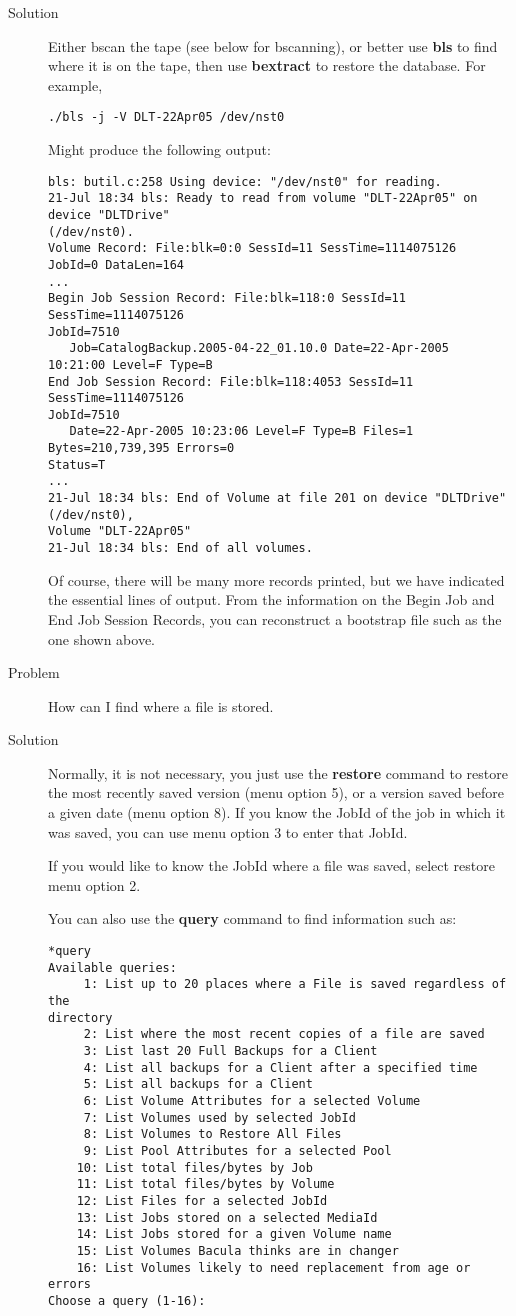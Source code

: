 \begin{description}
\item [Solution]
  Either bscan the tape (see below for bscanning), or better use {\bf bls}
  to find where it is on the tape, then use {\bf bextract} to 
  restore the database.  For example,


\footnotesize
\begin{verbatim}
./bls -j -V DLT-22Apr05 /dev/nst0
\end{verbatim}
\normalsize
  Might produce the following output:
\footnotesize
\begin{verbatim}
bls: butil.c:258 Using device: "/dev/nst0" for reading.
21-Jul 18:34 bls: Ready to read from volume "DLT-22Apr05" on device "DLTDrive"
(/dev/nst0).
Volume Record: File:blk=0:0 SessId=11 SessTime=1114075126 JobId=0 DataLen=164
...
Begin Job Session Record: File:blk=118:0 SessId=11 SessTime=1114075126
JobId=7510
   Job=CatalogBackup.2005-04-22_01.10.0 Date=22-Apr-2005 10:21:00 Level=F Type=B
End Job Session Record: File:blk=118:4053 SessId=11 SessTime=1114075126
JobId=7510
   Date=22-Apr-2005 10:23:06 Level=F Type=B Files=1 Bytes=210,739,395 Errors=0
Status=T
...
21-Jul 18:34 bls: End of Volume at file 201 on device "DLTDrive" (/dev/nst0),
Volume "DLT-22Apr05"
21-Jul 18:34 bls: End of all volumes.
\end{verbatim}
\normalsize
  Of course, there will be many more records printed, but we have indicated
  the essential lines of output. From the information on the Begin Job and End 
  Job Session Records, you can reconstruct a bootstrap file such as the one
  shown above.

\item[Problem]
  How can I find where a file is stored.
\item[Solution]
  Normally, it is not necessary, you just use the {\bf restore} command to
  restore the most recently saved version (menu option 5), or a version
  saved before a given date (menu option 8).  If you know the JobId of the
  job in which it was saved, you can use menu option 3 to enter that JobId.

  If you would like to know the JobId where a file was saved, select
  restore menu option 2.

  You can also use the {\bf query} command to find information such as: 
\footnotesize
\begin{verbatim}
*query
Available queries:
     1: List up to 20 places where a File is saved regardless of the
directory
     2: List where the most recent copies of a file are saved
     3: List last 20 Full Backups for a Client
     4: List all backups for a Client after a specified time
     5: List all backups for a Client
     6: List Volume Attributes for a selected Volume
     7: List Volumes used by selected JobId
     8: List Volumes to Restore All Files
     9: List Pool Attributes for a selected Pool
    10: List total files/bytes by Job
    11: List total files/bytes by Volume
    12: List Files for a selected JobId
    13: List Jobs stored on a selected MediaId
    14: List Jobs stored for a given Volume name
    15: List Volumes Bacula thinks are in changer
    16: List Volumes likely to need replacement from age or errors
Choose a query (1-16):
\end{verbatim}
\normalsize


\end{description}
